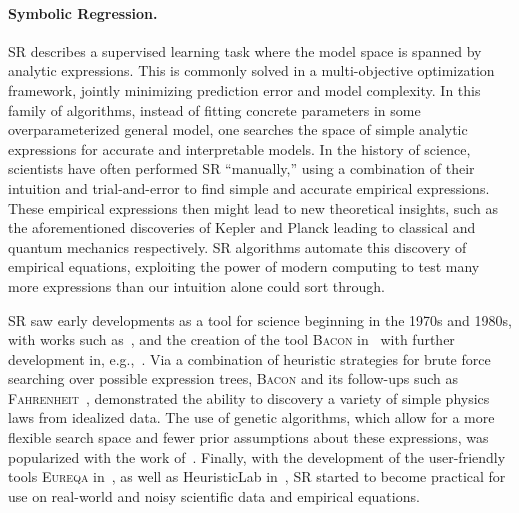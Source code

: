 \documentclass[letterpaper,twocolumn]{scrartcl}
\newcommand\eureqa{\textsc{Eureqa}\xspace}
\begin{document}
\begin{linenumbers}
\paragraph{Symbolic Regression.}
SR describes a supervised learning task where the model space is spanned by analytic expressions.
This is commonly solved in a multi-objective optimization framework, jointly minimizing prediction error and model complexity.
In this family of algorithms, instead of fitting concrete parameters in some overparameterized general model, one searches the space of simple analytic expressions for accurate and interpretable models.
In the history of science, scientists have often performed SR ``manually,'' using a combination of their intuition and trial-and-error to find simple and accurate empirical expressions.
These empirical expressions then might lead to new theoretical insights, such as the aforementioned discoveries of Kepler and Planck leading to classical and quantum mechanics respectively.
SR algorithms automate this discovery of empirical equations, exploiting the power of modern computing to test many more expressions than our intuition alone could sort through.

SR saw early developments 
as a tool for science beginning in the 1970s and 1980s, with works such as~\cite{gerwinInformationProcessingData1974}, and the creation of the tool \textsc{Bacon} in~\cite{langleyBACONProductionSystem1977} with further development in, e.g.,~\cite{langleyRediscoveringPhysicsBACON1979,langleyBACONDiscoveryConservation1981}.
Via a combination of heuristic strategies for brute force searching over possible expression trees, \textsc{Bacon} and its follow-ups such as \textsc{Fahrenheit}~\cite{langleyDatadrivenApproachesEmpirical1989}, demonstrated the ability to discovery a variety of simple physics laws from idealized data.
The use of genetic algorithms, which allow for a more flexible search space and fewer prior assumptions about these expressions, was popularized with the work of~\cite{kozaGeneticProgrammingMeans1994}.
Finally, with the development of the user-friendly tools \eureqa in~\cite{bongardCoverAutomatedReverse2007,schmidtDistillingFreeFormNatural2009,schmidtSymbolicRegressionImplicit2010}, as well as HeuristicLab in~\cite{wagnerHeuristicLabGenericExtensible2005}, SR started to become practical for use on real-world and noisy scientific data and empirical equations.


\end{linenumbers}
\end{document}
